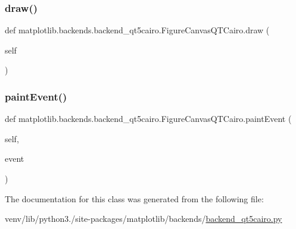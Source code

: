 \subsubsection{\texorpdfstring{draw()}{draw()}}
{\footnotesize\ttfamily def matplotlib.\+backends.\+backend\+\_\+qt5cairo.\+Figure\+Canvas\+Q\+T\+Cairo.\+draw (\begin{DoxyParamCaption}\item[{}]{self }\end{DoxyParamCaption})}

\mbox{\label{classmatplotlib_1_1backends_1_1backend__qt5cairo_1_1FigureCanvasQTCairo_acaef1b2135550065a334c1882b3ffb6e}} 
\subsubsection{\texorpdfstring{paint\+Event()}{paintEvent()}}
{\footnotesize\ttfamily def matplotlib.\+backends.\+backend\+\_\+qt5cairo.\+Figure\+Canvas\+Q\+T\+Cairo.\+paint\+Event (\begin{DoxyParamCaption}\item[{}]{self,  }\item[{}]{event }\end{DoxyParamCaption})}



The documentation for this class was generated from the following file\+:\begin{DoxyCompactItemize}
\item 
venv/lib/python3./site-\/packages/matplotlib/backends/\hyperlink{backend__qt5cairo_8py}{backend\+\_\+qt5cairo.\+py}\end{DoxyCompactItemize}
